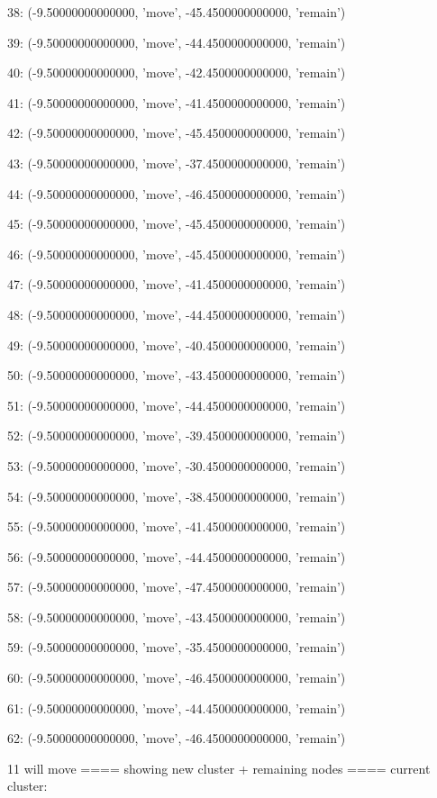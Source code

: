 38: (-9.50000000000000, 'move', -45.4500000000000, 'remain')


39: (-9.50000000000000, 'move', -44.4500000000000, 'remain')


40: (-9.50000000000000, 'move', -42.4500000000000, 'remain')


41: (-9.50000000000000, 'move', -41.4500000000000, 'remain')


42: (-9.50000000000000, 'move', -45.4500000000000, 'remain')


43: (-9.50000000000000, 'move', -37.4500000000000, 'remain')


44: (-9.50000000000000, 'move', -46.4500000000000, 'remain')


45: (-9.50000000000000, 'move', -45.4500000000000, 'remain')


46: (-9.50000000000000, 'move', -45.4500000000000, 'remain')


47: (-9.50000000000000, 'move', -41.4500000000000, 'remain')


48: (-9.50000000000000, 'move', -44.4500000000000, 'remain')


49: (-9.50000000000000, 'move', -40.4500000000000, 'remain')


50: (-9.50000000000000, 'move', -43.4500000000000, 'remain')


51: (-9.50000000000000, 'move', -44.4500000000000, 'remain')


52: (-9.50000000000000, 'move', -39.4500000000000, 'remain')


53: (-9.50000000000000, 'move', -30.4500000000000, 'remain')


54: (-9.50000000000000, 'move', -38.4500000000000, 'remain')


55: (-9.50000000000000, 'move', -41.4500000000000, 'remain')


56: (-9.50000000000000, 'move', -44.4500000000000, 'remain')


57: (-9.50000000000000, 'move', -47.4500000000000, 'remain')


58: (-9.50000000000000, 'move', -43.4500000000000, 'remain')


59: (-9.50000000000000, 'move', -35.4500000000000, 'remain')


60: (-9.50000000000000, 'move', -46.4500000000000, 'remain')


61: (-9.50000000000000, 'move', -44.4500000000000, 'remain')


62: (-9.50000000000000, 'move', -46.4500000000000, 'remain')


11 will move
==== showing new cluster + remaining nodes ====
current cluster:



